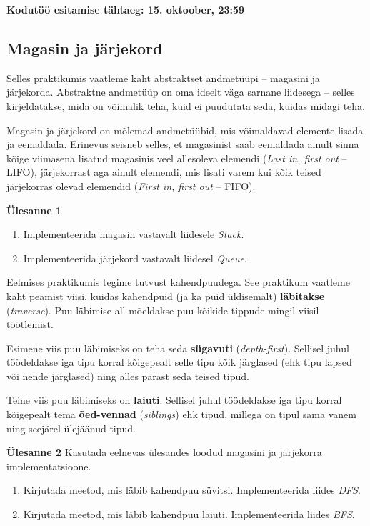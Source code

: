 \documentclass[a4paper]{article}
\begin{document}
\textbf{Kodutöö esitamise tähtaeg: 15. oktoober, 23:59}

{\center
\subsection*{Magasin ja järjekord}
}

Selles praktikumis vaatleme kaht abstraktset andmetüüpi -- magasini ja järjekorda. Abstraktne andmetüüp on oma ideelt väga sarnane liidesega -- selles kirjeldatakse, mida on võimalik teha, kuid ei puudutata seda, kuidas midagi teha.

Magasin ja järjekord on mõlemad andmetüübid, mis võimaldavad elemente lisada ja eemaldada. Erinevus seisneb selles, et magasinist saab eemaldada ainult sinna kõige viimasena lisatud magasinis veel allesoleva elemendi (\textit{Last in, first out} -- LIFO), järjekorrast aga ainult elemendi, mis lisati varem kui kõik teised järjekorras olevad elemendid (\textit{First in, first out} -- FIFO).



\begin{problem}
\textbf{Ülesanne 1}
\begin{enumerate}
\item 
Implementeerida magasin vastavalt liidesele \textit{Stack}.
\item Implementeerida järjekord vastavalt liidesel \textit{Queue}.
\end{enumerate}
\end{problem}


Eelmises praktikumis tegime tutvust kahendpuudega. See praktikum vaatleme kaht peamist viisi, kuidas kahendpuid (ja ka puid üldisemalt) \textbf{läbitakse} (\textit{traverse}). Puu läbimise all mõeldakse puu kõikide tippude mingil viisil töötlemist.

Esimene viis puu läbimiseks on teha seda \textbf{sügavuti} (\textit{depth-first}). Sellisel juhul töödeldakse iga tipu korral kõigepealt selle tipu kõik järglased (ehk tipu lapsed või nende järglased) ning alles pärast seda teised tipud.

Teine viis puu läbimiseks on \textbf{laiuti}. Sellisel juhul töödeldakse iga tipu korral kõigepealt tema \textbf{õed-vennad} (\textit{siblings}) ehk tipud, millega on tipul sama vanem ning seejärel ülejäänud tipud.

\begin{problem}
\textbf{Ülesanne 2}
\newline
Kasutada eelnevas ülesandes loodud magasini ja järjekorra implementatsioone.
\begin{enumerate}
\item
Kirjutada meetod, mis läbib kahendpuu süvitsi. Implementeerida liides \textit{DFS}.
\item
Kirjutada meetod, mis läbib kahendpuu laiuti. Implementeerida liides \textit{BFS}.
\end{enumerate}
\end{problem}
\end{document}
